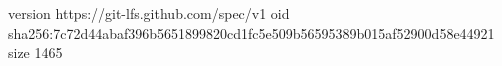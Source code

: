 version https://git-lfs.github.com/spec/v1
oid sha256:7c72d44abaf396b5651899820cd1fc5e509b56595389b015af52900d58e44921
size 1465
